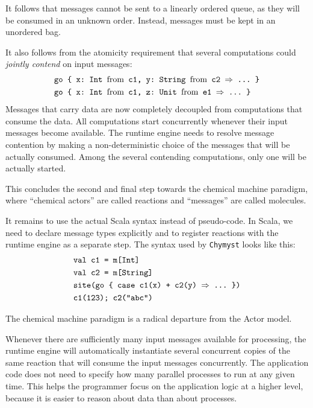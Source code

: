 \documentclass[sigplan,10pt,review,anonymous]{acmart}\settopmatter{printfolios=true}
\begin{document}
It follows that messages cannot be sent to a linearly ordered queue,
as they will be consumed in an unknown order.
Instead, messages must be kept in an unordered bag.

It also follows from the atomicity requirement that
several computations could \emph{jointly contend} on input messages:
\begin{align*}
\text{} & \text{\texttt{go \{ x:~Int \textnormal{from} c1, y:~String \textnormal{from} c2 \ensuremath{\Rightarrow} ...~\}}}\\
 & \text{\texttt{go \{ x:~Int \textnormal{from} c1, z:~Unit \textnormal{from} e1 \ensuremath{\Rightarrow} ...~\}}}
\end{align*}
Messages that carry data are now completely decoupled from computations
that consume the data. All computations start concurrently whenever
their input messages become available. The runtime engine needs to
resolve message contention by making a non-deterministic choice of
the messages that will be actually consumed. Among the several contending
computations, only one will be actually started.

This concludes the second and final step towards the chemical machine
paradigm, where ``chemical actors'' are called reactions and ``messages'' are called molecules.

It remains to use the actual Scala syntax instead of pseudo-code.
In Scala, we need to declare message types explicitly and to register
reactions with the runtime engine as a separate step.
The syntax used by \texttt{Chymyst} looks like this:
\begin{align*}
\text{} & \text{\texttt{val c1 = m[Int]}}\\
 & \text{\texttt{val c2 = m[String]}}\\
 & \text{\texttt{site(go \{ case c1(x) + c2(y) \ensuremath{\Rightarrow} ...~\})}}\\
 & \text{\texttt{c1(123); }\texttt{c2("abc")}}
\end{align*}

The chemical machine paradigm is a radical departure
from the Actor model.

Whenever there are sufficiently many input messages available for
processing, the runtime engine will automatically instantiate several
concurrent copies of the same reaction that will consume the input
messages concurrently. The application code
does not need to specify how many parallel processes to run at any
given time.
This helps the programmer focus on the application logic at a higher level,
because it is easier to reason about data than about processes.
\end{document}
